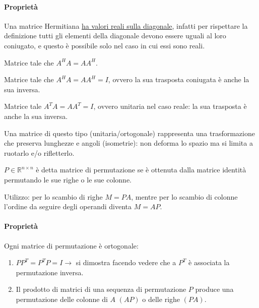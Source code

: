 \documentclass[12pt,a4paper,]{report}
\begin{document}
\paragraph{Proprietà}
Una matrice Hermitiana \uline{ha valori reali sulla diagonale}, infatti per rispettare la definizione tutti gli elementi della diagonale devono essere uguali al loro coniugato, e questo è possibile solo nel caso in cui essi sono reali.
\begin{definizione}
    Matrice tale che $A^HA = AA^H$.
\end{definizione}
\begin{definizione}
    Matrice tale che $A^HA = AA^H = I$, ovvero la sua trasposta coniugata è anche la sua inversa.
\end{definizione}
\begin{definizione}
    Matrice tale $A^TA = AA^T = I$, ovvero unitaria nel caso reale: la sua trasposta è anche la sua inversa.
\end{definizione}
\begin{nota}
    Una matrice di questo tipo (unitaria/ortogonale) rappresenta una trasformazione che preserva lunghezze e angoli (isometrie): non deforma lo spazio ma si limita a ruotarlo e/o rifletterlo.
\end{nota}
\begin{definizione}
    $P \in \mathbb{R}^{n\times n}$ è detta matrice di permutazione se è ottenuta dalla matrice identità permutando le sue righe o le sue colonne.
\end{definizione}
\begin{nota}
    Utilizzo: per lo scambio di righe $M = PA$, mentre per lo scambio di colonne l'ordine da seguire degli operandi diventa $M = AP$.
\end{nota}
\noindent
\paragraph{Proprietà}
Ogni matrice di permutazione è ortogonale:
\begin{enumerate}
    \item $PP^T = P^T P = I\to$ si dimostra facendo vedere che a $P^T$ è associata la permutazione inversa.
    \item Il prodotto di matrici di una sequenza di permutazione $P$ produce una permutazione delle colonne di $A$ $(AP)$ o delle righe $(PA)$.
\end{enumerate}
\end{document}
